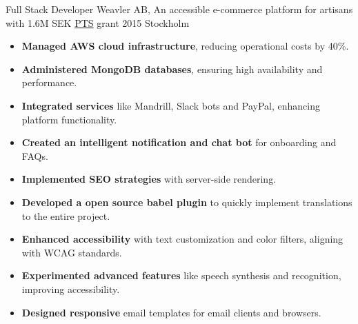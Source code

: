 {Full Stack Developer}
{Weavler AB, An accessible e-commerce platform for artisans with 1.6M SEK \href{https://pts.se}{PTS} grant 2015}
{Stockholm \Large{}}{}
{
  \begin{itemize}[itemsep=0.5pt, topsep=1pt]
    \item \textbf{Managed AWS cloud infrastructure}, reducing operational costs by 40\%.
    \item \textbf{Administered MongoDB databases}, ensuring high availability and performance.
    \item \textbf{Integrated services} like Mandrill, Slack bots and PayPal, enhancing platform functionality.
    \item \textbf{Created an intelligent notification and chat bot} for onboarding and FAQs.
    \item \textbf{Implemented SEO strategies} with server-side rendering.
    \item \textbf{Developed a open source babel plugin} to quickly implement translations to the entire project.
    \item \textbf{Enhanced accessibility} with text customization and color filters, aligning with WCAG standards.
    \item \textbf{Experimented advanced features} like speech synthesis and recognition, improving accessibility.
    \item \textbf{Designed responsive} email templates for email clients and browsers.
  \end{itemize}
}
